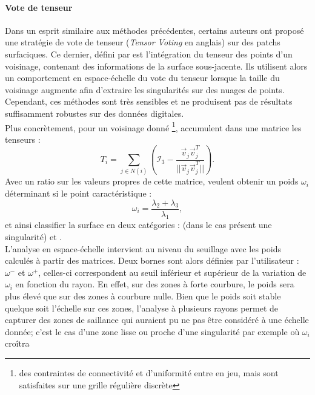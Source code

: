 \paragraph{Vote de tenseur}
%
%
Dans un esprit similaire aux méthodes précédentes, certains auteurs
\cite{Park2012} ont proposé une stratégie de vote de tenseur (\emph{Tensor
Voting} en anglais) sur des patchs surfaciques. Ce dernier, défini par
 est l'intégration du tenseur des points d'un
voisinage, contenant des informations de la surface sous-jacente. Ils utilisent
alors un comportement en espace-échelle du vote du tenseur lorsque la taille du
voisinage augmente afin d'extraire les singularités sur des nuages de points.
Cependant, ces méthodes sont très sensibles et ne produisent pas de résultats
suffisamment robustes sur des données digitales.
%
\\
%
Plus concrètement, pour un voisinage donné \footnote{des contraintes de
connectivité et d'uniformité entre en jeu, mais sont satisfaites sur une grille
régulière discrète},  accumulent dans une matrice les
tenseurs :
%
\begin{equation}
  T_i = \sum\limits_{j \in N(i)} \left(\mathcal{I}_3 - \frac{\overrightarrow{v}_j\overrightarrow{v}_j^T}{||\overrightarrow{v}_j\overrightarrow{v}_j^T||} \right) .
\end{equation}
%
%
Avec un ratio sur les valeurs propres de cette matrice,  veulent
obtenir un poids $\omega_i$ déterminant si le point caractéristique :
%
\begin{equation}
  \omega_i = \frac{\lambda_2 + \lambda_3}{\lambda_1},
\end{equation}
%
et ainsi classifier la surface en deux catégories : \Feature (\cad dans le cas
présent une singularité) et \NonFeature.
%
\\
%
L'analyse en espace-échelle intervient au niveau du seuillage avec les poids
calculés à partir des matrices. Deux bornes sont alors définies par
l'utilisateur : $\omega^-$ et $\omega^+$, celles-ci correspondent au seuil
inférieur et supérieur de la variation de $\omega_i$ en fonction du rayon. En
effet, sur des zones à forte courbure, le poids sera plus élevé que sur des
zones à courbure nulle. Bien que le poids soit stable quelque soit l'échelle sur
ces zones, l'analyse à plusieurs rayons permet de capturer des zones de
saillance qui auraient pu ne pas être considéré à une échelle donnée; c'est le
cas d'une zone lisse ou proche d'une singularité par exemple où $\omega_i$ croîtra
